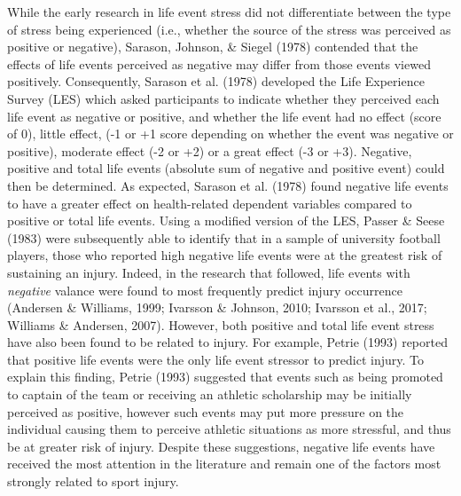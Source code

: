 \documentclass[
  english,
  man,floatsintext]{apa6}
\begin{document}
While the early research in life event stress did not differentiate between the type of stress being experienced (i.e., whether the source of the stress was perceived as positive or negative), Sarason, Johnson, \& Siegel (1978)
contended that the effects of life events perceived as negative may differ from those events viewed positively.
Consequently, Sarason et al. (1978)
developed the Life Experience Survey (LES) which asked participants to indicate whether they perceived each life event as negative or positive, and whether the life event had no effect (score of 0), little effect, (-1 or +1 score depending on whether the event was negative or positive), moderate effect (-2 or +2) or a great effect (-3 or +3).
Negative, positive and total life events (absolute sum of negative and positive event) could then be determined. As expected, Sarason et al. (1978) found negative life events to have a greater effect on health-related dependent variables compared to positive or total life events.
Using a modified version of the LES, Passer \& Seese (1983) were subsequently able to identify that in a sample of university football players, those who reported high negative life events were at the greatest risk of sustaining an injury.
Indeed, in the research that followed, life events with \emph{negative} valance were found to most frequently predict injury occurrence (Andersen \& Williams, 1999; Ivarsson \& Johnson, 2010; Ivarsson et al., 2017; Williams \& Andersen, 2007).
However, both positive and total life event stress have also been found to be related to injury.
For example, Petrie (1993) reported that positive life events were the only life event stressor to predict injury.
To explain this finding, Petrie (1993) suggested that events such as being promoted to captain of the team or receiving an athletic scholarship may be initially perceived as positive, however such events may put more pressure on the individual causing them to perceive athletic situations as more stressful, and thus be at greater risk of injury.
Despite these suggestions, negative life events have received the most attention in the literature and remain one of the factors most strongly related to sport injury.
\end{document}

